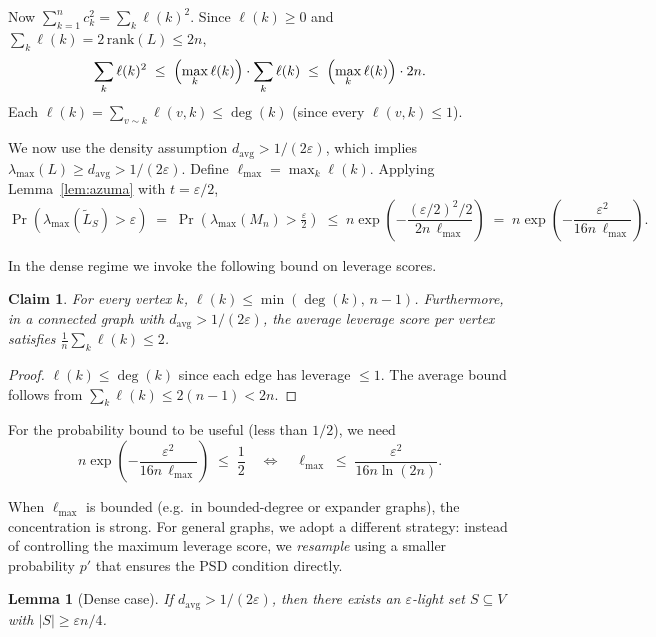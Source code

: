 \documentclass[12pt]{article}
\newtheorem{lemma}[theorem]{Lemma}
\newtheorem{claim}[theorem]{Claim}
\theoremstyle{definition}
\theoremstyle{remark}
\begin{document}
Now $\sum_{k=1}^n c_k^2 = \sum_k \ell(k)^2$.  Since $\ell(k) \ge 0$ and
$\sum_k \ell(k) = 2\,\mathrm{rank}(L) \le 2n$,
\[
  \sum_k \ell(k)^2 \;\le\; \Bigl(\max_k \ell(k)\Bigr)\cdot\sum_k \ell(k)
  \;\le\; \Bigl(\max_k \ell(k)\Bigr)\cdot 2n.
\]
Each $\ell(k) = \sum_{v\sim k}\ell(v,k) \le \deg(k)$ (since every $\ell(v,k) \le 1$).

\medskip
\noindent
We now use the density assumption $d_{\mathrm{avg}} > 1/(2\varepsilon)$, which implies
$\lambda_{\max}(L) \ge d_{\mathrm{avg}} > 1/(2\varepsilon)$.  Define
$\ell_{\max} = \max_k \ell(k)$.  Applying Lemma~\ref{lem:azuma} with
$t = \varepsilon/2$,
\[
  \Pr\!\left(\lambda_{\max}\!\left(\widetilde{L}_S\right) > \varepsilon\right)
  \;=\; \Pr\!\left(\lambda_{\max}(M_n) > \tfrac{\varepsilon}{2}\right)
  \;\le\; n\exp\!\!\left(-\frac{(\varepsilon/2)^2/2}{2n\,\ell_{\max}}\right)
  \;=\; n\exp\!\!\left(-\frac{\varepsilon^2}{16n\,\ell_{\max}}\right).
\]

In the dense regime we invoke the following bound on leverage scores.

\begin{claim}\label{cl:lev}
For every vertex $k$, $\ell(k) \le \min\!\left(\deg(k),\, n-1\right)$.
Furthermore, in a connected graph with $d_{\mathrm{avg}} > 1/(2\varepsilon)$, the
average leverage score per vertex satisfies $\frac{1}{n}\sum_k \ell(k) \le 2$.
\end{claim}

\begin{proof}
$\ell(k) \le \deg(k)$ since each edge has leverage $\le 1$.  The average bound
follows from $\sum_k \ell(k) \le 2(n-1) < 2n$.
\end{proof}

For the probability bound to be useful (less than $1/2$), we need
\[
  n\exp\!\!\left(-\frac{\varepsilon^2}{16n\,\ell_{\max}}\right) \;\le\; \frac{1}{2}
  \quad\Longleftrightarrow\quad
  \ell_{\max} \;\le\; \frac{\varepsilon^2}{16n\ln(2n)}.
\]

When $\ell_{\max}$ is bounded (e.g.\ in bounded-degree or expander graphs), the
concentration is strong.  For general graphs, we adopt a different strategy:
instead of controlling the maximum leverage score, we \emph{resample} using a
smaller probability $p'$ that ensures the PSD condition directly.

\begin{lemma}[Dense case]\label{lem:dense}
If $d_{\mathrm{avg}} > 1/(2\varepsilon)$, then there exists an $\varepsilon$-light
set $S \subseteq V$ with $|S| \ge \varepsilon n/4$.
\end{lemma}
\end{document}
